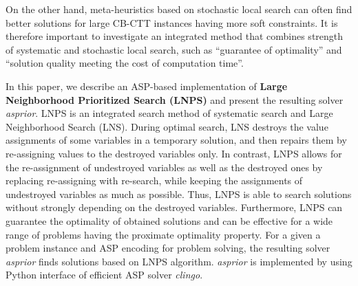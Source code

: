 \documentclass[dvipdfmx,a4paper]{jsarticle}
\begin{document}
On the other hand, 
meta-heuristics based on stochastic local search 
can often find better solutions for 
large CB-CTT instances having more soft constraints. 
It is therefore important to investigate 
an integrated method that combines
strength of systematic and stochastic local search, such as
``guarantee of optimality'' and 
``solution quality meeting the cost of computation time''.


In this paper, 
we describe an ASP-based implementation of 
   \textbf{Large Neighborhood Prioritized Search (LNPS)} 
and present the resulting solver \textit{asprior}. 
%
LNPS is an integrated search method of
systematic search and Large Neighborhood Search (LNS). 
During optimal search,
LNS destroys the value assignments of some variables in a
temporary solution, and then repairs them by re-assigning values to
the destroyed variables only.
In contrast, LNPS allows for the re-assignment of undestroyed variables
as well as the destroyed ones by 
replacing re-assigning with re-search,
while keeping the assignments of undestroyed variables as much as possible. 
Thus, LNPS is able to search solutions without strongly 
depending on the destroyed variables. 
Furthermore, LNPS can guarantee the optimality of obtained solutions
and can be effective for a wide range of problems having the proximate
optimality property.
%
For a given a problem instance and ASP encoding for problem solving,
the resulting solver \textit{asprior} finds solutions based on LNPS
algorithm.
\textit{asprior} is implemented by using Python interface of efficient
ASP solver \textit{clingo}.
\end{document}

